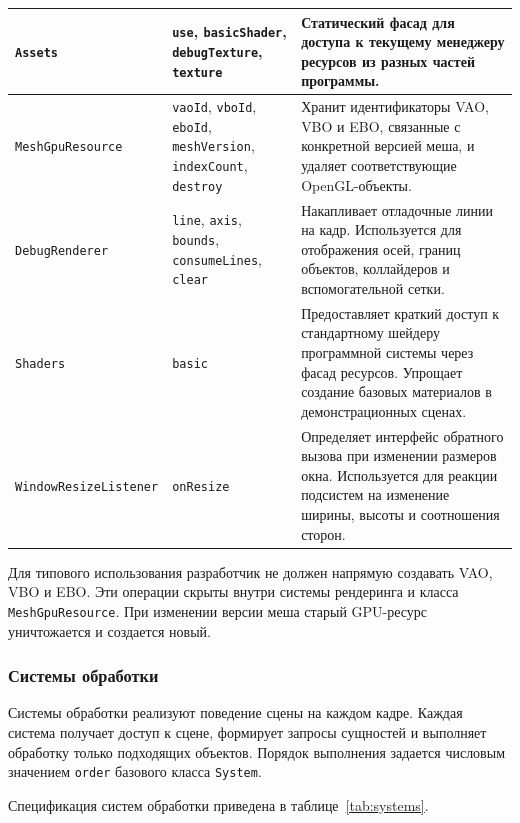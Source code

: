 \begin{xltabular}{\textwidth}{|p{0.22\textwidth}|p{0.26\textwidth}|X|}
\hline
\texttt{Assets} & \texttt{use}, \texttt{basicShader}, \texttt{debugTexture}, \texttt{texture} & Статический фасад для доступа к текущему менеджеру ресурсов из разных частей программы. \\
\hline
\texttt{MeshGpuResource} & \texttt{vaoId}, \texttt{vboId}, \texttt{eboId}, \texttt{meshVersion}, \texttt{indexCount}, \texttt{destroy} & Хранит идентификаторы VAO, VBO и EBO, связанные с конкретной версией меша, и удаляет соответствующие OpenGL-объекты. \\
\hline
\texttt{DebugRenderer} & \texttt{line}, \texttt{axis}, \texttt{bounds}, \texttt{consumeLines}, \texttt{clear} & Накапливает отладочные линии на кадр. Используется для отображения осей, границ объектов, коллайдеров и вспомогательной сетки. \\
\hline
\texttt{Shaders} & \texttt{basic} & Предоставляет краткий доступ к стандартному шейдеру программной системы через фасад ресурсов. Упрощает создание базовых материалов в демонстрационных сценах. \\
\hline
\texttt{WindowResizeListener} & \texttt{onResize} & Определяет интерфейс обратного вызова при изменении размеров окна. Используется для реакции подсистем на изменение ширины, высоты и соотношения сторон. \\
\hline
\end{xltabular}
\renewcommand{\arraystretch}{1.0}
\endgroup

Для типового использования разработчик не должен напрямую создавать VAO, VBO и
EBO. Эти операции скрыты внутри системы рендеринга и класса
\texttt{MeshGpuResource}. При изменении версии меша старый GPU-ресурс уничтожается
и создается новый.

\subsubsection{Системы обработки}

Системы обработки реализуют поведение сцены на каждом кадре. Каждая система
получает доступ к сцене, формирует запросы сущностей и выполняет обработку
только подходящих объектов. Порядок выполнения задается числовым значением
\texttt{order} базового класса \texttt{System}.

Спецификация систем обработки приведена в таблице~\ref{tab:systems}.

